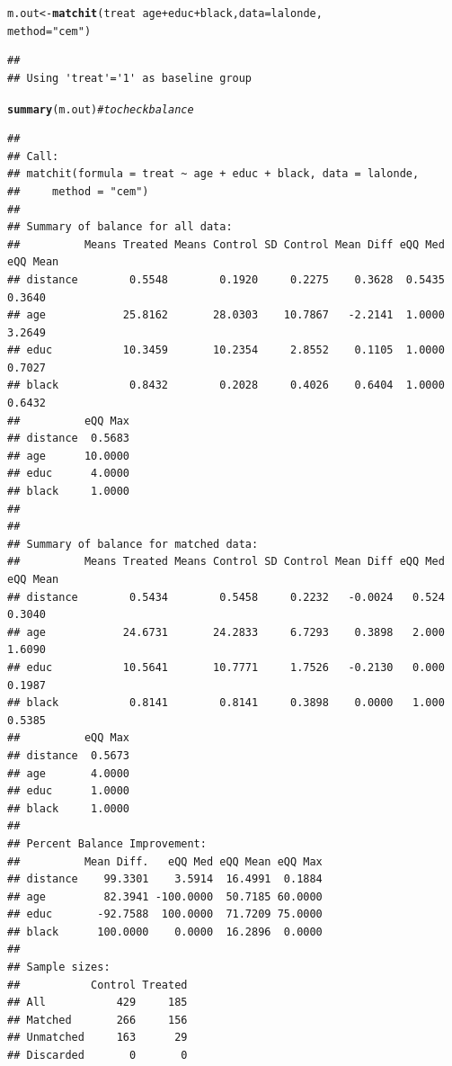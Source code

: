 \documentclass{article}\usepackage[]{graphicx}\usepackage[]{color}
\makeatletter
\newcommand{\hlstr}[1]{\textcolor[rgb]{0.192,0.494,0.8}{#1}}%
\newcommand{\hlcom}[1]{\textcolor[rgb]{0.678,0.584,0.686}{\textit{#1}}}%
\newcommand{\hlopt}[1]{\textcolor[rgb]{0,0,0}{#1}}%
\newcommand{\hlstd}[1]{\textcolor[rgb]{0.345,0.345,0.345}{#1}}%
\newcommand{\hlkwb}[1]{\textcolor[rgb]{0.69,0.353,0.396}{#1}}%
\newcommand{\hlkwc}[1]{\textcolor[rgb]{0.333,0.667,0.333}{#1}}%
\newcommand{\hlkwd}[1]{\textcolor[rgb]{0.737,0.353,0.396}{\textbf{#1}}}%
\newenvironment{kframe}{%
 \def\at@end@of@kframe{}%
 \ifinner\ifhmode%
  \def\at@end@of@kframe{\end{minipage}}%
  \begin{minipage}{\columnwidth}%
 \fi\fi%
 \def\FrameCommand##1{\hskip\@totalleftmargin \hskip-\fboxsep
 \colorbox{shadecolor}{##1}\hskip-\fboxsep
     \hskip-\linewidth \hskip-\@totalleftmargin \hskip\columnwidth}%
 \MakeFramed {\advance\hsize-\width
   \@totalleftmargin\z@ \linewidth\hsize
   \@setminipage}}%
 {\par\unskip\endMakeFramed%
 \at@end@of@kframe}
\newenvironment{knitrout}{}{} %
\makeatother
\begin{document}
\begin{knitrout}
\color{fgcolor}\begin{kframe}
\begin{alltt}
\hlstd{m.out} \hlkwb{<-} \hlkwd{matchit}\hlstd{(treat} \hlopt{~} \hlstd{age} \hlopt{+} \hlstd{educ} \hlopt{+} \hlstd{black,} \hlkwc{data} \hlstd{= lalonde,}
                 \hlkwc{method} \hlstd{=} \hlstr{"cem"}\hlstd{)}
\end{alltt}


{\ttfamily\noindent\itshape{}}\begin{verbatim}
## 
## Using 'treat'='1' as baseline group
\end{verbatim}
\begin{alltt}
\hlkwd{summary}\hlstd{(m.out)} \hlcom{# to check balance}
\end{alltt}
\begin{verbatim}
## 
## Call:
## matchit(formula = treat ~ age + educ + black, data = lalonde, 
##     method = "cem")
## 
## Summary of balance for all data:
##          Means Treated Means Control SD Control Mean Diff eQQ Med eQQ Mean
## distance        0.5548        0.1920     0.2275    0.3628  0.5435   0.3640
## age            25.8162       28.0303    10.7867   -2.2141  1.0000   3.2649
## educ           10.3459       10.2354     2.8552    0.1105  1.0000   0.7027
## black           0.8432        0.2028     0.4026    0.6404  1.0000   0.6432
##          eQQ Max
## distance  0.5683
## age      10.0000
## educ      4.0000
## black     1.0000
## 
## 
## Summary of balance for matched data:
##          Means Treated Means Control SD Control Mean Diff eQQ Med eQQ Mean
## distance        0.5434        0.5458     0.2232   -0.0024   0.524   0.3040
## age            24.6731       24.2833     6.7293    0.3898   2.000   1.6090
## educ           10.5641       10.7771     1.7526   -0.2130   0.000   0.1987
## black           0.8141        0.8141     0.3898    0.0000   1.000   0.5385
##          eQQ Max
## distance  0.5673
## age       4.0000
## educ      1.0000
## black     1.0000
## 
## Percent Balance Improvement:
##          Mean Diff.   eQQ Med eQQ Mean eQQ Max
## distance    99.3301    3.5914  16.4991  0.1884
## age         82.3941 -100.0000  50.7185 60.0000
## educ       -92.7588  100.0000  71.7209 75.0000
## black      100.0000    0.0000  16.2896  0.0000
## 
## Sample sizes:
##           Control Treated
## All           429     185
## Matched       266     156
## Unmatched     163      29
## Discarded       0       0
\end{verbatim}
\end{kframe}
\end{knitrout}
\end{document}
